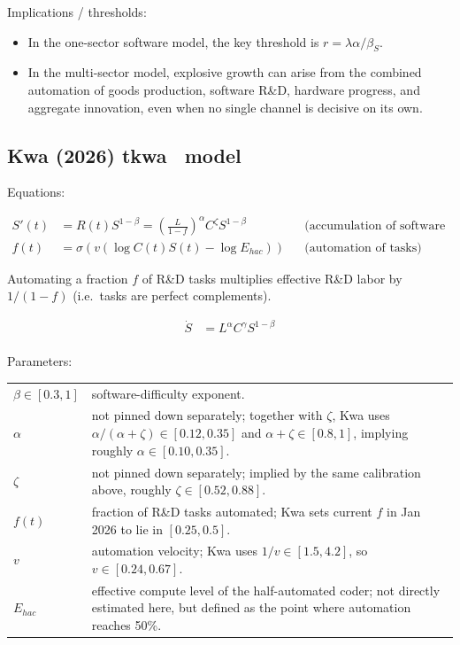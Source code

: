 \documentclass[
  11pt,
  letterpaper,
  DIV=11,
  numbers=noendperiod]{scrartcl}
\providecommand{\tightlist}{%
  \setlength{\itemsep}{0pt}\setlength{\parskip}{0pt}}
\begin{document}
Implications / thresholds:

\begin{itemize}
\tightlist
\item
  In the one-sector software model, the key threshold is
  \(r = \lambda\alpha/\beta_S\).
\item
  In the multi-sector model, explosive growth can arise from the
  combined automation of goods production, software R\&D, hardware
  progress, and aggregate innovation, even when no single channel is
  decisive on its own.
\end{itemize}

\subsection{Kwa (2026) tkwa~
model}\label{kwa2026simpleraitimelines-tkwa-model}

Equations:

\[
\begin{aligned}
   S'(t) &= R(t) S^{1 - \beta} = \left(\frac L {1-f}\right)^\alpha C^\zeta S^{1 - \beta}
    && \text{(accumulation of software ideas)}\\
   f(t) &= \sigma(v(\log C(t)S(t) - \log E_{hac})) 
    && \text{(automation of tasks)}
\end{aligned}
\]

Automating a fraction \(f\) of R\&D tasks multiplies effective R\&D
labor by \(1/(1-f)\) (i.e.~tasks are perfect complements).

\[\begin{aligned}
   \dot{S}  &= L^\alpha C^\gamma S^{1-\beta} \\
\end{aligned}
\]

Parameters:

\begin{longtable}[]{@{}
  >{\raggedright\arraybackslash}p{}
  >{\raggedright\arraybackslash}p{}@{}}
\toprule\noalign{}
\endhead
\bottomrule\noalign{}
\endlastfoot
\(\beta\in [0.3,1]\) & software-difficulty exponent. \\
\(\alpha\) & not pinned down separately; together with \(\zeta\), Kwa
uses \(\alpha/(\alpha+\zeta)\in [0.12,0.35]\) and
\(\alpha+\zeta\in [0.8,1]\), implying roughly
\(\alpha\in [0.10,0.35]\). \\
\(\zeta\) & not pinned down separately; implied by the same calibration
above, roughly \(\zeta\in [0.52,0.88]\). \\
\(f(t)\) & fraction of R\&D tasks automated; Kwa sets current \(f\) in
Jan 2026 to lie in \([0.25,0.5]\). \\
\(v\) & automation velocity; Kwa uses \(1/v\in [1.5,4.2]\), so
\(v\in [0.24,0.67]\). \\
\(E_{hac}\) & effective compute level of the half-automated coder; not
directly estimated here, but defined as the point where automation
reaches 50\%. \\
\end{longtable}
\end{document}

